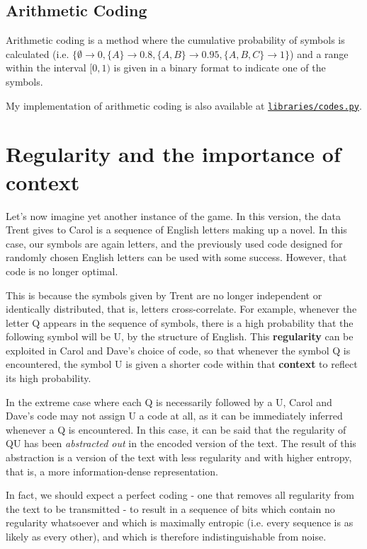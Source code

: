 \subsection{Arithmetic Coding}

Arithmetic coding is a method where the cumulative probability of symbols is calculated (i.e. $\{\emptyset \rightarrow 0, \{A\} \rightarrow 0.8, \{A,B\} \rightarrow 0.95, \{A,B,C\} \rightarrow 1\}$) and a range within the interval $[0,1)$ is given in a binary format to indicate one of the symbols.

My implementation of arithmetic coding is also available at \texttt{\href{https://github.com/Guy29/FYP/blob/main/Code/libraries/codes.py}{libraries/codes.py}}.

\section{Regularity and the importance of context}
\label{sec:regularity_and_context}

Let's now imagine yet another instance of the game. In this version, the data Trent gives to Carol is a sequence of English letters making up a novel. In this case, our symbols are again letters, and the previously used code designed for randomly chosen English letters can be used with some success. However, that code is no longer optimal.

This is because the symbols given by Trent are no longer independent or identically distributed, that is, letters cross-correlate. For example, whenever the letter Q appears in the sequence of symbols, there is a high probability that the following symbol will be U, by the structure of English. This \textbf{regularity} can be exploited in Carol and Dave's choice of code, so that whenever the symbol Q is encountered, the symbol U is given a shorter code within that \textbf{context} to reflect its high probability.

In the extreme case where each Q is necessarily followed by a U, Carol and Dave's code may not assign U a code at all, as it can be immediately inferred whenever a Q is encountered. In this case, it can be said that the regularity of QU has been \emph{abstracted out} in the encoded version of the text. The result of this abstraction is a version of the text with less regularity and with higher entropy, that is, a more information-dense representation.

In fact, we should expect a perfect coding - one that removes all regularity from the text to be transmitted - to result in a sequence of bits which contain no regularity whatsoever and which is maximally entropic (i.e. every sequence is as likely as every other), and which is therefore indistinguishable from noise.


